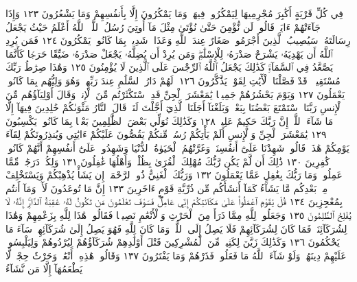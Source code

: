 فِي كُلِّ قَرْيَةٍ أَكَٰبِرَ مُجْرِمِيهَا لِيَمْكُرُوا۟ فِيهَاۖ وَمَا
يَمْكُرُونَ إِلَّا بِأَنفُسِهِمْ وَمَا يَشْعُرُونَ ١٢٣ وَإِذَا جَآءَتْهُمْ
ءَايَةࣱ قَالُوا۟ لَن نُّؤْمِنَ حَتَّىٰ نُؤْتَىٰ مِثْلَ مَآ أُوتِيَ رُسُلُ ٱللَّهِۘ ٱللَّهُ
أَعْلَمُ حَيْثُ يَجْعَلُ رِسَالَتَهُۥۗ سَيُصِيبُ ٱلَّذِينَ أَجْرَمُوا۟ صَغَارٌ
عِندَ ٱللَّهِ وَعَذَابࣱ شَدِيدُۢ بِمَا كَانُوا۟ يَمْكُرُونَ ١٢٤
فَمَن يُرِدِ ٱللَّهُ أَن يَهْدِيَهُۥ يَشْرَحْ صَدْرَهُۥ لِلْإِسْلَٰمِۖ وَمَن
يُرِدْ أَن يُضِلَّهُۥ يَجْعَلْ صَدْرَهُۥ ضَيِّقًا حَرَجࣰا كَأَنَّمَا
يَصَّعَّدُ فِي ٱلسَّمَآءِۚ كَذَٰلِكَ يَجْعَلُ ٱللَّهُ ٱلرِّجْسَ عَلَى ٱلَّذِينَ
لَا يُؤْمِنُونَ ١٢٥ وَهَٰذَا صِرَٰطُ رَبِّكَ مُسْتَقِيمࣰاۗ قَدْ فَصَّلْنَا
ٱلْأٓيَٰتِ لِقَوْمࣲ يَذَّكَّرُونَ ١٢٦۞ لَهُمْ دَارُ ٱلسَّلَٰمِ عِندَ
رَبِّهِمْۖ وَهُوَ وَلِيُّهُم بِمَا كَانُوا۟ يَعْمَلُونَ ١٢٧ وَيَوْمَ يَحْشُرُهُمْ
جَمِيعࣰا يَٰمَعْشَرَ ٱلْجِنِّ قَدِ ٱسْتَكْثَرْتُم مِّنَ ٱلْإِنسِۖ وَقَالَ
أَوْلِيَآؤُهُم مِّنَ ٱلْإِنسِ رَبَّنَا ٱسْتَمْتَعَ بَعْضُنَا بِبَعْضࣲ وَبَلَغْنَآ
أَجَلَنَا ٱلَّذِيٓ أَجَّلْتَ لَنَاۚ قَالَ ٱلنَّارُ مَثْوَىٰكُمْ خَٰلِدِينَ فِيهَآ
إِلَّا مَا شَآءَ ٱللَّهُۚ إِنَّ رَبَّكَ حَكِيمٌ عَلِيمࣱ ١٢٨ وَكَذَٰلِكَ نُوَلِّي
بَعْضَ ٱلظَّٰلِمِينَ بَعْضَۢا بِمَا كَانُوا۟ يَكْسِبُونَ ١٢٩
يَٰمَعْشَرَ ٱلْجِنِّ وَٱلْإِنسِ أَلَمْ يَأْتِكُمْ رُسُلࣱ مِّنكُمْ
يَقُصُّونَ عَلَيْكُمْ ءَايَٰتِي وَيُنذِرُونَكُمْ لِقَآءَ يَوْمِكُمْ
هَٰذَاۚ قَالُوا۟ شَهِدْنَا عَلَىٰٓ أَنفُسِنَاۖ وَغَرَّتْهُمُ ٱلْحَيَوٰةُ ٱلدُّنْيَا
وَشَهِدُوا۟ عَلَىٰٓ أَنفُسِهِمْ أَنَّهُمْ كَانُوا۟ كَٰفِرِينَ ١٣٠
ذَٰلِكَ أَن لَّمْ يَكُن رَّبُّكَ مُهْلِكَ ٱلْقُرَىٰ بِظُلْمࣲ وَأَهْلُهَا
غَٰفِلُونَ ١٣١ وَلِكُلࣲّ دَرَجَٰتࣱ مِّمَّا عَمِلُوا۟ۚ وَمَا رَبُّكَ
بِغَٰفِلٍ عَمَّا يَعْمَلُونَ ١٣٢ وَرَبُّكَ ٱلْغَنِيُّ ذُو ٱلرَّحْمَةِۚ
إِن يَشَأْ يُذْهِبْكُمْ وَيَسْتَخْلِفْ مِنۢ بَعْدِكُم مَّا
يَشَآءُ كَمَآ أَنشَأَكُم مِّن ذُرِّيَّةِ قَوْمٍ ءَاخَرِينَ ١٣٣
إِنَّ مَا تُوعَدُونَ لَأٓتࣲۖ وَمَآ أَنتُم بِمُعْجِزِينَ ١٣٤ قُلْ يَٰقَوْمِ
ٱعْمَلُوا۟ عَلَىٰ مَكَانَتِكُمْ إِنِّي عَامِلࣱۖ فَسَوْفَ تَعْلَمُونَ
مَن تَكُونُ لَهُۥ عَٰقِبَةُ ٱلدَّارِۚ إِنَّهُۥ لَا يُفْلِحُ ٱلظَّٰلِمُونَ ١٣٥
وَجَعَلُوا۟ لِلَّهِ مِمَّا ذَرَأَ مِنَ ٱلْحَرْثِ وَٱلْأَنْعَٰمِ نَصِيبࣰا
فَقَالُوا۟ هَٰذَا لِلَّهِ بِزَعْمِهِمْ وَهَٰذَا لِشُرَكَآئِنَاۖ فَمَا كَانَ
لِشُرَكَآئِهِمْ فَلَا يَصِلُ إِلَى ٱللَّهِۖ وَمَا كَانَ لِلَّهِ فَهُوَ
يَصِلُ إِلَىٰ شُرَكَآئِهِمْۗ سَآءَ مَا يَحْكُمُونَ ١٣٦ وَكَذَٰلِكَ
زَيَّنَ لِكَثِيرࣲ مِّنَ ٱلْمُشْرِكِينَ قَتْلَ أَوْلَٰدِهِمْ
شُرَكَآؤُهُمْ لِيُرْدُوهُمْ وَلِيَلْبِسُوا۟ عَلَيْهِمْ دِينَهُمْۖ
وَلَوْ شَآءَ ٱللَّهُ مَا فَعَلُوهُۖ فَذَرْهُمْ وَمَا يَفْتَرُونَ ١٣٧
وَقَالُوا۟ هَٰذِهِۦٓ أَنْعَٰمࣱ وَحَرْثٌ حِجْرࣱ لَّا يَطْعَمُهَآ إِلَّا مَن نَّشَآءُ
